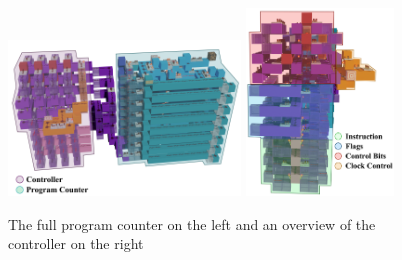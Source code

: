 \begin{figure}[bp!]
    \begin{center}
        \includegraphics[width=0.55\textwidth]{Figures/FlagsPC_1-small.png}
        \includegraphics[width=0.35\textwidth]{Figures/FlagsPC-small.png}
        \caption[Program Counter]{The full program counter on the left and an overview of the controller on the right}
        \label{fig::FlagsPC}
    \end{center}
\end{figure}
